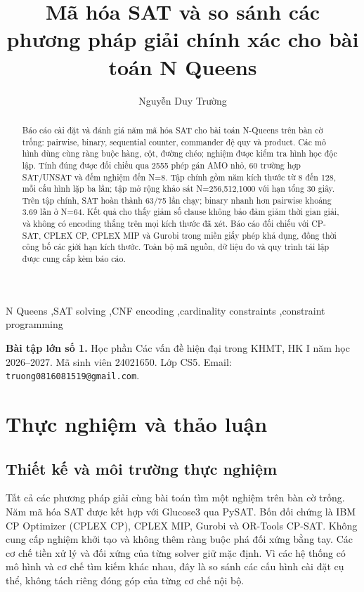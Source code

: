 \documentclass[a4paper,fleqn]{cas-sc}
\begin{document}
\title[mode=title]{Mã hóa SAT và so sánh các phương pháp giải chính xác cho bài toán N Queens}
\author[1]{Nguyễn Duy Trường}
\begin{abstract}
Báo cáo cài đặt và đánh giá năm mã hóa SAT cho bài toán N-Queens trên bàn cờ trống: pairwise, binary, sequential counter, commander đệ quy và product. Các mô hình dùng cùng ràng buộc hàng, cột, đường chéo; nghiệm được kiểm tra hình học độc lập. Tính đúng được đối chiếu qua 2555 phép gán AMO nhỏ, 60 trường hợp SAT/UNSAT và đếm nghiệm đến N=8. Tập chính gồm năm kích thước từ 8 đến 128, mỗi cấu hình lặp ba lần; tập mở rộng khảo sát N=256,512,1000 với hạn tổng 30 giây. Trên tập chính, SAT hoàn thành 63/75 lần chạy; binary nhanh hơn pairwise khoảng 3.69 lần ở N=64. Kết quả cho thấy giảm số clause không bảo đảm giảm thời gian giải, và không có encoding thắng trên mọi kích thước đã xét. Báo cáo đối chiếu với CP-SAT, CPLEX CP, CPLEX MIP và Gurobi trong miền giấy phép khả dụng, đồng thời công bố các giới hạn kích thước. Toàn bộ mã nguồn, dữ liệu đo và quy trình tái lập được cung cấp kèm báo cáo.
\end{abstract}
\begin{keywords}
N Queens \sep SAT solving \sep CNF encoding \sep cardinality constraints \sep constraint programming
\end{keywords}
\maketitle
\noindent\textbf{Bài tập lớn số 1.} Học phần Các vấn đề hiện đại trong KHMT,
HK I năm học 2026--2027. Mã sinh viên 24021650. Lớp CS5.
Email: \texttt{truong0816081519@gmail.com}.



\section{Thực nghiệm và thảo luận}
\label{sec:experiments}

\subsection{Thiết kế và môi trường thực nghiệm}

Tất cả các phương pháp giải cùng bài toán tìm một nghiệm trên bàn cờ trống.
Năm mã hóa SAT được kết hợp với Glucose3 qua PySAT. Bốn đối chứng là IBM CP Optimizer
(CPLEX CP), CPLEX MIP, Gurobi và OR-Tools CP-SAT. Không cung cấp nghiệm khởi tạo
và không thêm ràng buộc phá đối xứng bằng tay. Các cơ chế tiền xử lý và đối xứng
của từng solver giữ mặc định. Vì các hệ thống có mô hình và cơ chế tìm kiếm khác nhau,
đây là so sánh các cấu hình cài đặt cụ thể, không tách riêng đóng góp của từng cơ chế nội bộ.
\end{document}
